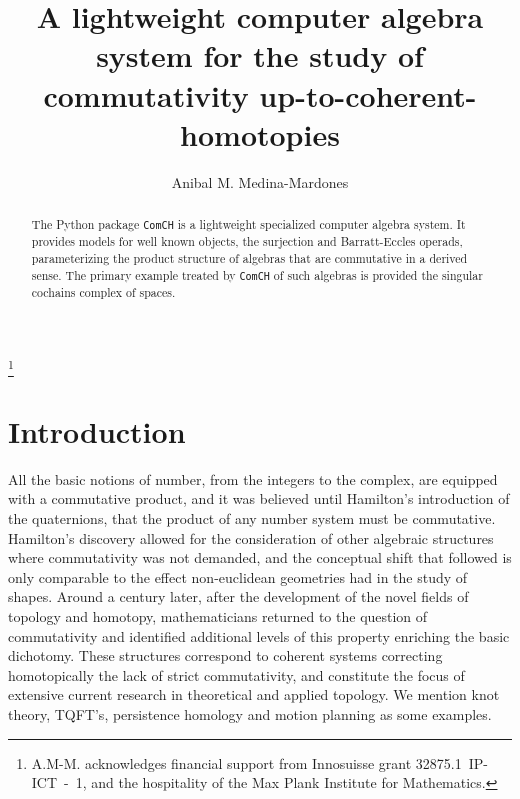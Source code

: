 \documentclass{amsart}
\begin{document}
\title{A lightweight computer algebra system for the study of commutativity up-to-coherent-homotopies}
\author{Anibal M. Medina-Mardones}
\address{Max Plank Institute for Mathematics, Bonn, Germany}
\address{Department of Mathematics, University of Notre Dame, Notre Dame, IN, USA}
\thanks{A.M-M. acknowledges financial support from Innosuisse grant \mbox{32875.1 IP-ICT - 1}, and the hospitality of the Max Plank Institute for Mathematics.}

\begin{abstract}
	The Python package \texttt{ComCH} is a lightweight specialized computer algebra system. It provides models for well known objects, the surjection and Barratt-Eccles operads, parameterizing the product structure of algebras that are commutative in a derived sense. The primary example treated by \texttt{ComCH} of such algebras is provided the singular cochains complex of spaces.
\end{abstract} 

\maketitle

\section{Introduction}

All the basic notions of number, from the integers to the complex, are equipped with a commutative product, and it was believed until Hamilton's introduction of the quaternions, that the product of any number system must be commutative. Hamilton's discovery allowed for the consideration of other algebraic structures where commutativity was not demanded, and the conceptual shift that followed is only comparable to the effect non-euclidean geometries had in the study of shapes. Around a century later, after the development of the novel fields of topology and homotopy, mathematicians returned to the question of commutativity and identified additional levels of this property enriching the basic dichotomy. These structures correspond to coherent systems correcting homotopically the lack of strict commutativity, and constitute the focus of extensive current research in theoretical and applied topology. We mention knot theory, TQFT's, persistence homology and motion planning as some examples.
\end{document}
